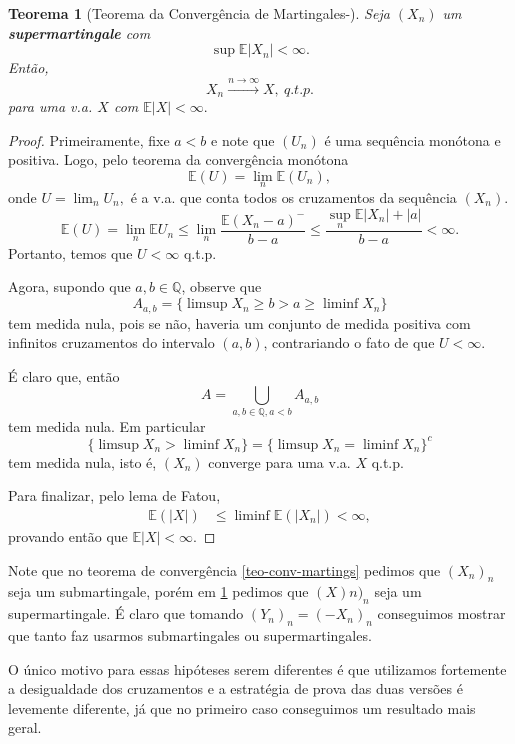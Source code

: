 \documentclass[12pt,a4paper,oneside]{book}
\newtheorem{theorem}{Teorema}[section]
\theoremstyle{definition}
\theoremstyle{remark}
\numberwithin{equation}{section}
\newcommand{\E}{\mathbb{E}}
\newcommand{\rarrowlimn}{\xrightarrow{n\rightarrow \infty}}
\begin{document}
\begin{theorem}[Teorema da Convergência de Martingales-\cite{williams-martingales}]\label{teo-conv-martings-will} 
 Seja $(X_n)$ um \textbf{supermartingale} com 
$$ \sup \E |X_n| <\infty. $$
Então, 
$$X_n \rarrowlimn X,\ q.t.p. $$
para uma v.a. $X$ com $\E|X|<\infty.$
\end{theorem}
\begin{proof}

Primeiramente, fixe $a<b$ e note que $(U_n)$ é uma sequência monótona e positiva. Logo, pelo teorema da convergência monótona
$$\E(U) = \lim_n\E(U_n), $$
onde $U = \lim_n U_n,$ é a v.a. que conta todos os cruzamentos da sequência $(X_n).$
$$\E(U) = \lim_n\E U_n \leq\lim_n \dfrac{\E(X_n-a)^-}{b-a}\leq  \dfrac{\sup_n \E |X_n| + |a|}{b-a}<\infty.$$
Portanto, temos que $U<\infty$ q.t.p.

Agora, supondo que $a,b\in \mathbb{Q}$, observe que
$$A_{a,b}= \{ \limsup X_n \geq b>a\geq \liminf X_n \}$$
tem medida nula, pois se não, haveria um conjunto de medida positiva com infinitos cruzamentos do intervalo $(a,b)$, contrariando o fato de que $U<\infty.$

É claro que, então 
$$A = \bigcup_{a,b\in \mathbb{Q},a<b} A_{a,b} $$
tem medida nula. Em particular
$$\{\limsup X_n > \liminf X_n \} =\{\limsup X_n = \liminf X_n\}^c $$
tem medida nula, isto é, $(X_n)$ converge para uma v.a. $X$ q.t.p.

Para finalizar, pelo lema de Fatou,
\begin{align*}
\E(|X|) &\leq \liminf\E(|X_n|)<\infty,
\end{align*}
provando então que $\E|X|<\infty.$
\end{proof}




\begin{tcolorbox}[colback = yellow!60]
Note que no teorema de convergência \ref{teo-conv-martings} pedimos que $(X_n)_n$ seja um submartingale, porém em \ref{teo-conv-martings-will} pedimos que $(X)n)_n$ seja um supermartingale. É claro que tomando $(Y_n)_n = (-X_n)_n$ conseguimos mostrar que tanto faz usarmos submartingales ou supermartingales.

O único motivo para essas hipóteses serem diferentes é que utilizamos fortemente a desigualdade dos cruzamentos e a estratégia de prova das duas versões é levemente diferente, já que no primeiro caso conseguimos um resultado mais geral.
\end{tcolorbox}
\end{document}
